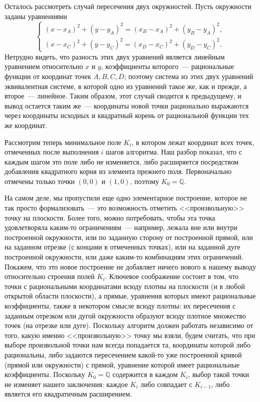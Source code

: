 \documentclass[a4paper,11pt]{scrartcl}
\theoremstyle{plain}
\theoremstyle{definition}
\newcommand\mb{\mathbb}
\begin{document}
Осталось рассмотреть случай пересечения двух окружностей. Пусть
окружности заданы уравнениями
$$
\left\{
\begin{aligned}
(x-x_A)^2+(y-y_A)^2=(x_B-x_A)^2+(y_B-y_A)^2,\\
(x-x_C)^2+(y-y_C)^2=(x_D-x_C)^2+(y_D-y_C)^2.
\end{aligned}
\right.
$$
Нетрудно видеть, что разность этих двух уравнений является линейным
уравнением относительно $x$ и $y$, коэффициенты которого~---
рациональные функции от координат точек $A,B,C,D$; поэтому система из
этих двух уравнений эквивалентная системе, в которой одно из уравнений
такое же, как и прежде, а второе~--- линейное. Таким образом, этот
случай сводится к предыдущему, и вывод остается таким же~---
координаты новой точки рационально выражаются через координаты
исходных и квадратный корень от рациональной функции тех же координат.

Рассмотрим теперь минимальное поле $K_i$, в котором лежат координат всех
точек, отмеченных после выполнения $i$ шагов алгоритма. Наш разбор
показал, что с каждым шагом это поле либо не изменяется, либо
расширяется посредством добавления квадратного корня из элемента
прежнего поля. Первоначально отмечены только точки $(0,0)$ и $(1,0)$,
поэтому $K_0=\mb Q$.

  На самом деле, мы пропустили еще одно элементарное построение, которое
не так просто формализовать~--- это возможность отметить
<<произвольную>> точку на плоскости. Более того, можно потребовать,
чтобы эта точка удовлетворяла каким-то ограничениям~--- например,
лежала вне или внутри построенной окружности, или по заданную сторону
от построенной прямой, или на заданном отрезке (с концами в отмеченных
точках), или на заданной дуге построенной окружности, или даже
каким-то комбинациям этих ограничений. Покажем, что это новое
построение не добавляет ничего нового к нашему выводу относительно
строения полей $K_i$. Ключевое соображение состоит в том, что точки с
рациональными координатами всюду плотны на плоскости (и в любой
открытой области плоскости), а прямые, уравнения которых имеют
рациональные коэффициенты, также в некотором смысле всюду плотны: их
пересечения с заданным отрезком или дугой окружности образуют всюду
плотное множество точек (на отрезке или дуге). Поскольку алгоритм
должен работать независимо от того, какую именно <<произвольную>>
точку мы взяли, будем считать, что при выборе произвольной точки нам
всегда попадается та, координаты которой либо рациональны, либо
задаются пересечением какой-то уже построенной кривой (прямой или
окружности) с прямой, уравнение которой имеет рациональные
коэффициенты. Поскольку $K_0=\mb Q$ содержится в каждом $K_i$, выбор
такой точки не изменяет нашего заключения: каждое $K_i$ либо совпадает
с $K_{i-1}$, либо является его квадратичным расширением.
\end{document}

